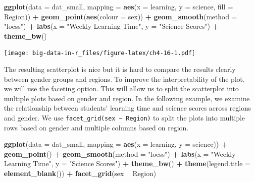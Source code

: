 \documentclass[]{book}
\newenvironment{Shaded}{\begin{snugshade}}{\end{snugshade}}
\newcommand{\DataTypeTok}[1]{\textcolor[rgb]{0.13,0.29,0.53}{#1}}
\newcommand{\KeywordTok}[1]{\textcolor[rgb]{0.13,0.29,0.53}{\textbf{#1}}}
\newcommand{\NormalTok}[1]{#1}
\newcommand{\OperatorTok}[1]{\textcolor[rgb]{0.81,0.36,0.00}{\textbf{#1}}}
\newcommand{\StringTok}[1]{\textcolor[rgb]{0.31,0.60,0.02}{#1}}
\begin{document}
\begin{Shaded}
\begin{Highlighting}[]
\KeywordTok{ggplot}\NormalTok{(}\DataTypeTok{data =}\NormalTok{ dat_small,}
       \DataTypeTok{mapping =} \KeywordTok{aes}\NormalTok{(}\DataTypeTok{x =}\NormalTok{ learning, }\DataTypeTok{y =}\NormalTok{ science, }\DataTypeTok{fill =}\NormalTok{ Region)) }\OperatorTok{+}
\StringTok{  }\KeywordTok{geom_point}\NormalTok{(}\KeywordTok{aes}\NormalTok{(}\DataTypeTok{colour =}\NormalTok{ sex)) }\OperatorTok{+}
\StringTok{  }\KeywordTok{geom_smooth}\NormalTok{(}\DataTypeTok{method =} \StringTok{"loess"}\NormalTok{) }\OperatorTok{+}
\StringTok{  }\KeywordTok{labs}\NormalTok{(}\DataTypeTok{x =} \StringTok{"Weekly Learning Time"}\NormalTok{, }\DataTypeTok{y =} \StringTok{"Science Scores"}\NormalTok{) }\OperatorTok{+}
\StringTok{  }\KeywordTok{theme_bw}\NormalTok{()}
\end{Highlighting}
\end{Shaded}

\texttt{[image: big-data-in-r\_files/figure-latex/ch4-16-1.pdf]}

The resulting scatterplot is nice but it is hard to compare the results clearly between gender groups and regions. To improve the interpretability of the plot, we will use the faceting option. This will allow us to split the scatterplot into multiple plots based on gender and region. In the following example, we examine the relationship between students' learning time and science scores across regions and gender. We use \texttt{facet\_grid(sex\ \textasciitilde{}\ Region)} to split the plots into multiple rows based on gender and multiple columns based on region.

\begin{Shaded}
\begin{Highlighting}[]
\KeywordTok{ggplot}\NormalTok{(}\DataTypeTok{data =}\NormalTok{ dat_small,}
       \DataTypeTok{mapping =} \KeywordTok{aes}\NormalTok{(}\DataTypeTok{x =}\NormalTok{ learning, }\DataTypeTok{y =}\NormalTok{ science)) }\OperatorTok{+}
\StringTok{  }\KeywordTok{geom_point}\NormalTok{() }\OperatorTok{+}
\StringTok{  }\KeywordTok{geom_smooth}\NormalTok{(}\DataTypeTok{method =} \StringTok{"loess"}\NormalTok{) }\OperatorTok{+}
\StringTok{  }\KeywordTok{labs}\NormalTok{(}\DataTypeTok{x =} \StringTok{"Weekly Learning Time"}\NormalTok{, }\DataTypeTok{y =} \StringTok{"Science Scores"}\NormalTok{) }\OperatorTok{+}
\StringTok{  }\KeywordTok{theme_bw}\NormalTok{() }\OperatorTok{+}
\StringTok{  }\KeywordTok{theme}\NormalTok{(}\DataTypeTok{legend.title =} \KeywordTok{element_blank}\NormalTok{()) }\OperatorTok{+}
\StringTok{  }\KeywordTok{facet_grid}\NormalTok{(sex }\OperatorTok{~}\StringTok{ }\NormalTok{Region)}
\end{Highlighting}
\end{Shaded}
\end{document}
